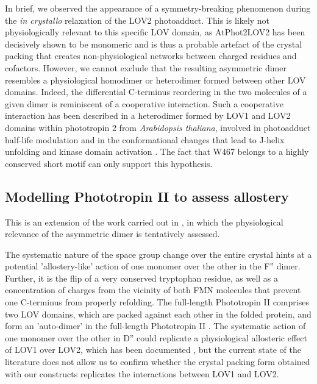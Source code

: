 In brief, we observed the appearance of a symmetry-breaking phenomenon during the \textit{in crystallo} relaxation of the LOV2 photoadduct. This is likely not physiologically relevant to this specific LOV domain, as AtPhot2LOV2 has been decisively shown to be monomeric \parencite{katsuraOligomericStructureLOV2009, nakasakoDomainOrganizationPlant2020} and is thus a probable artefact of the crystal packing that creates non-physiological networks between charged residues and cofactors. However, we cannot exclude that the resulting asymmetric dimer resembles a physiological homodimer or heterodimer formed between other LOV domains. Indeed, the differential C-terminus reordering in the two molecules of a given dimer is reminiscent of a cooperative interaction. Such a cooperative interaction has been described in a heterodimer formed by LOV1 and LOV2 domains within phototropin 2 from \textit{Arabidopsis thaliana}, involved in photoadduct half-life modulation \parencite{kasaharaPhotochemicalPropertiesFlavin2002} and in the conformational changes that lead to J\textalpha-helix unfolding and kinase domain activation \parencite{oideBlueLightExcited2018}. The fact that W467 belongs to a highly conserved short motif can only support this hypothesis.


\subsection{Modelling Phototropin II to assess allostery}\label{sec:PhotII_AF}
This is an extension of the work carried out in \cite{aumonierSlowProteinDynamics2022}, in which the physiological relevance of the asymmetric dimer is tentatively assessed. 

The systematic nature of the space group change over the entire crystal hints at a potential 'allostery-like' action of one monomer over the other in the F'' dimer. Further, it is the flip of a very conserved tryptophan residue, as well as a concentration of charges from the vicinity of both FMN molecules that prevent one C-terminus from properly refolding. The full-length Phototropin II comprises two LOV domains, which are packed against each other in the folded protein, and form an 'auto-dimer' in the full-length Phototropin II \parencite{oideBlueLightExcited2018}. The systematic action of one monomer over the other in D'' could replicate a physiological allosteric effect of LOV1 over LOV2, which has been documented \parencite{kasaharaPhotochemicalPropertiesFlavin2002}, but the current state of the literature does not allow us to confirm whether the crystal packing form obtained with our constructs replicates the interactions between LOV1 and LOV2.


